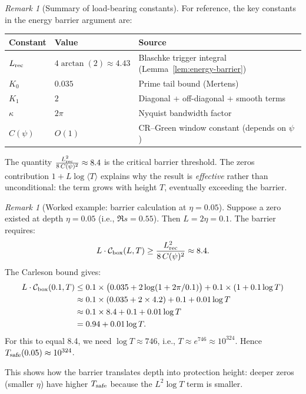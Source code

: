 \documentclass[11pt]{article}
\theoremstyle{definition}
\theoremstyle{remark}
\newtheorem{remark}[theorem]{Remark}
\theoremstyle{definition}
\begin{document}
\begin{remark}[Summary of load-bearing constants]\label{rem:constants-summary}
For reference, the key constants in the energy barrier argument are:
\begin{center}
\begin{tabular}{lll}
\toprule
\textbf{Constant} & \textbf{Value} & \textbf{Source} \\
\midrule
$L_{\rm rec}$ & $4\arctan(2) \approx 4.43$ & Blaschke trigger integral (Lemma~\ref{lem:energy-barrier}) \\
$K_0$ & $0.035$ & Prime tail bound (Mertens) \\
$K_1$ & $2$ & Diagonal + off-diagonal + smooth terms \\
$\kappa$ & $2\pi$ & Nyquist bandwidth factor \\
$C(\psi)$ & $O(1)$ & CR--Green window constant (depends on $\psi$) \\
\bottomrule
\end{tabular}
\end{center}
The quantity $\frac{L_{\rm rec}^2}{8\,C(\psi)^2} \approx 8.4$ is the critical barrier threshold. The zeros contribution $1 + L\log\langle T\rangle$ explains why the result is \emph{effective} rather than unconditional: the term grows with height $T$, eventually exceeding the barrier.
\end{remark}

\begin{remark}[Worked example: barrier calculation at $\eta = 0.05$]\label{rem:worked-example}
Suppose a zero existed at depth $\eta = 0.05$ (i.e., $\Re s = 0.55$). Then $L = 2\eta = 0.1$. The barrier requires:
\[
  L \cdot \mathcal{C}_{\rm box}(L, T) \ge \frac{L_{\rm rec}^2}{8\,C(\psi)^2} \approx 8.4.
\]
The Carleson bound gives:
\begin{align*}
L \cdot \mathcal{C}_{\rm box}(0.1, T) &\le 0.1 \times \big(0.035 + 2\log(1 + 2\pi/0.1)\big) + 0.1\times(1 + 0.1\log T) \\
&\approx 0.1 \times (0.035 + 2 \times 4.2) + 0.1 + 0.01\log T \\
&\approx 0.1 \times 8.4 + 0.1 + 0.01\log T \\
&= 0.94 + 0.01\log T.
\end{align*}
For this to equal 8.4, we need $\log T \approx 746$, i.e., $T \approx e^{746} \approx 10^{324}$. Hence $T_{\rm safe}(0.05) \approx 10^{324}$.

This shows how the barrier translates depth into protection height: deeper zeros (smaller $\eta$) have higher $T_{\rm safe}$ because the $L^2\log T$ term is smaller.
\end{remark}
\end{document}
